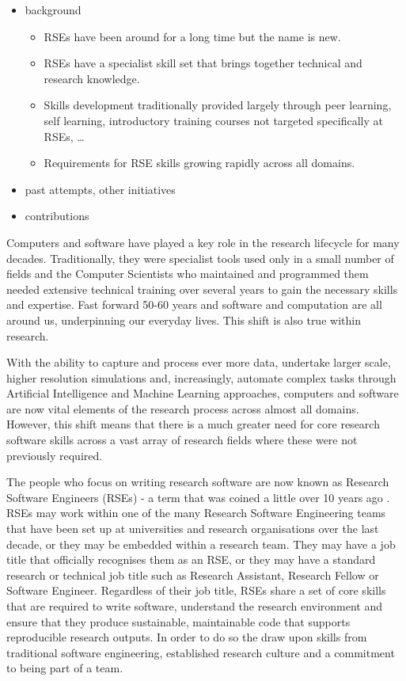 \documentclass[a4paper
]{article}
\providecommand{\tightlist}{%
  \setlength{\itemsep}{0pt}\setlength{\parskip}{0pt}}
\begin{document}
\begin{itemize}
\tightlist
\item
  background

  \begin{itemize}
  \tightlist
  \item
    RSEs have been around for a long time but the name is new.
  \item
    RSEs have a specialist skill set that brings together technical and
    research knowledge.
  \item
    Skills development traditionally provided largely through peer
    learning, self learning, introductory training courses not targeted
    specifically at RSEs, \ldots{}
  \item
    Requirements for RSE skills growing rapidly across all domains.
  \end{itemize}
\item
  past attempts, other initiatives
\item
  contributions
\end{itemize}

Computers and software have played a key role in the research lifecycle
for many decades. Traditionally, they were specialist tools used only in
a small number of fields and the Computer Scientists who maintained and
programmed them needed extensive technical training over several years
to gain the necessary skills and expertise. Fast forward 50-60 years and
software and computation are all around us, underpinning our everyday
lives. This shift is also true within research.

With the ability to capture and process ever more data, undertake larger
scale, higher resolution simulations and, increasingly, automate complex
tasks through Artificial Intelligence and Machine Learning approaches,
computers and software are now vital elements of the research process
across almost all domains. However, this shift means that there is a
much greater need for core research software skills across a vast array
of research fields where these were not previously required.

The people who focus on writing research software are now known as
Research Software Engineers (RSEs) - a term that was coined a little
over 10 years ago \autocite{Hettrick2016}. RSEs may work within one of
the many Research Software Engineering teams that have been set up at
universities and research organisations over the last decade, or they
may be embedded within a research team. They may have a job title that
officially recognises them as an RSE, or they may have a standard
research or technical job title such as Research Assistant, Research
Fellow or Software Engineer. Regardless of their job title, RSEs share a
set of core skills that are required to write software, understand the
research environment and ensure that they produce sustainable,
maintainable code that supports reproducible research outputs. In order
to do so the draw upon skills from traditional software engineering,
established research culture and a commitment to being part of a team.
\end{document}
